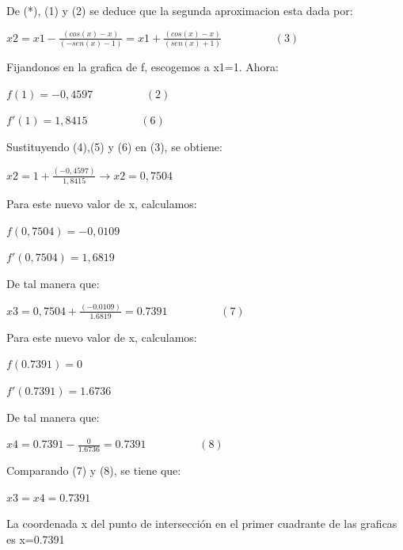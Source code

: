 De (*), (1) y (2) se deduce que la segunda aproximacion esta dada por:\\

\centerline{$ x2 = x1- \frac {(cos(x)-x)}{(-sen(x)-1)} = x1 + \frac {(cos(x)-x)}{(sen(x)+1)} \hspace{2cm}(3)$}
\vspace{0.5 cm} 


Fijandonos en la grafica de f, escogemos a x1=1. 
Ahora:\\

\centerline {$f(1)=-0, 4597 \hspace{2cm} (2)$} 
\centerline {$f'(1)= 1,8415 \hspace{2cm} (6)$}
\vspace{0.5 cm}

Sustituyendo (4),(5) y (6) en (3), se obtiene:\\

\centerline {$ x2 = 1 + \frac {(-0,4597)}{1,8415} \rightarrow x2 = 0,7504 $}
\vspace{0.5 cm}

Para este nuevo valor de x, calculamos:\\

\centerline {$f(0,7504) = -0,0109 $}
\centerline {$ f'(0,7504) = 1,6819 $}
\vspace{0.5 cm}

De tal manera que:\\

\centerline {$x3 = 0,7504 + \frac {(-0.0109)}{1.6819} = 0.7391 \hspace{2cm}(7)$}
\vspace{0.5 cm}

Para este nuevo valor de x, calculamos:\\

\centerline {$f(0.7391) = 0 $}
\centerline {$f'(0.7391) = 1.6736 $}
\vspace{0.5 cm}

De tal manera que:\\

\centerline {$x4 = 0.7391 - \frac {0} {1.6736} = 0.7391   \hspace{2cm}(8)$}
\vspace{0.5 cm}

Comparando (7) y (8), se tiene que:\\

\centerline {$x3=x4=0.7391$}
\vspace{0.5 cm}

La coordenada x del punto de intersección en el primer cuadrante de las graficas es x=0.7391 

